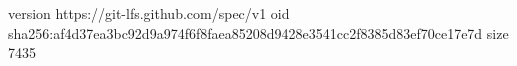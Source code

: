 version https://git-lfs.github.com/spec/v1
oid sha256:af4d37ea3bc92d9a974f6f8faea85208d9428e3541cc2f8385d83ef70ce17e7d
size 7435
